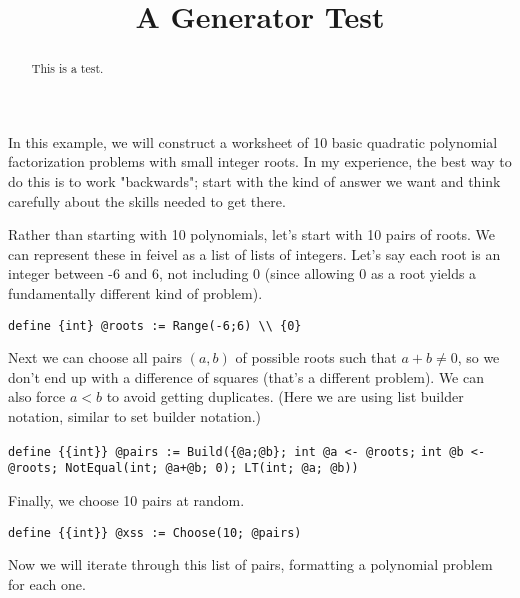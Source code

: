 \documentclass{ximera}
\begin{document}
\title{A Generator Test}
\begin{abstract}
This is a test.
\end{abstract}
\maketitle

In this example, we will construct a worksheet of 10 basic quadratic polynomial factorization problems with small integer roots. In my experience, the best way to do this is to work "backwards"; start with the kind of answer we want and think carefully about the skills needed to get there.


Rather than starting with 10 polynomials, let's start with 10 pairs of roots. We can represent these in feivel as a list of lists of integers. Let's say each root is an integer between -6 and 6, not including 0 (since allowing 0 as a root yields a fundamentally different kind of problem).
\begin{center}
\verb|define {int} @roots := Range(-6;6) \\ {0}|
\end{center}

Next we can choose all pairs $(a,b)$ of possible roots such that $a+b \neq 0$, so we don't end up with a difference of squares (that's a different problem). We can also force $a < b$ to avoid getting duplicates. (Here we are using list builder notation, similar to set builder notation.)
\begin{center}
\verb|define {{int}} @pairs := Build({@a;@b}; int @a <- @roots;|
\verb|int @b <- @roots; NotEqual(int; @a+@b; 0); LT(int; @a; @b))|
\end{center}

Finally, we choose 10 pairs at random.
\begin{center}
\verb|define {{int}} @xss := Choose(10; @pairs)|
\end{center}

Now we will iterate through this list of pairs, formatting a polynomial problem for each one.
\end{document}

